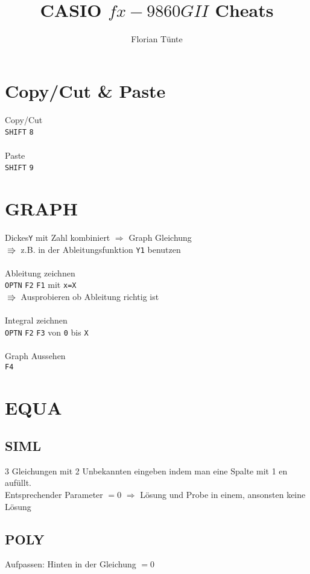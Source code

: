 \documentclass[12pt,a4paper]{article}
\date{}
\title{CASIO $fx-9860GII$ \glqq Cheats\grqq \vspace{-2ex}}
\author{Florian Tünte}
\def\g#1{\texttt{#1}}
\begin{document}
	\maketitle
	
	
	
	
		\section{Copy/Cut \& Paste}
	Copy/Cut\\
	\g{SHIFT} \g{8}\\\\
	Paste\\
	\g{SHIFT} \g{9}
	
	
	
	\section{GRAPH}
	\glqq Dickes\grqq \space \g{Y} mit Zahl kombiniert $\Rightarrow$ Graph Gleichung\\
	$ \Rrightarrow $ z.B. in der Ableitungsfunktion \g{Y1} benutzen\\\\
	Ableitung zeichnen\\
	\g{OPTN} \g{F2} \g{F1}  mit \g{x=X}\\
	$ \Rrightarrow $ Ausprobieren ob Ableitung richtig ist\\\\
	Integral zeichnen\\
	\g{OPTN} \g{F2} \g{F3}  von \g{0} bis \g{X}\\\\
	Graph Aussehen\\
	\g{F4}
	
	
	
	 \section{EQUA}
	 
	\subsection{SIML}
	3 Gleichungen mit 2 Unbekannten eingeben indem man eine Spalte mit 1 en auf\"ullt.\\
	Entsprechender Parameter $=0$ $\Rightarrow$ L\"osung und Probe in einem, ansonsten keine Lösung
	
	\subsection{POLY}
	Aufpassen: Hinten in der Gleichung $=0$
	
\end{document}
